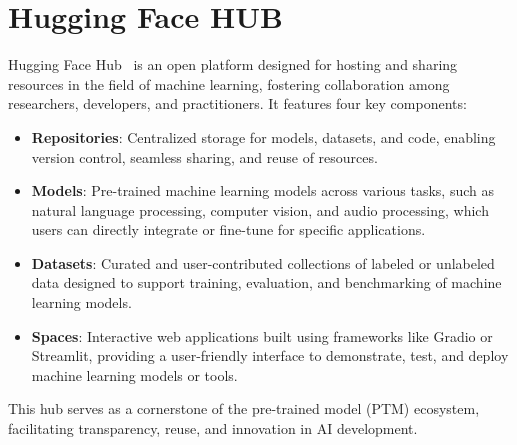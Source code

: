 \documentclass[12pt,a4paper, oneside, openright]{book}
\begin{document}
\section{Hugging Face HUB}
Hugging Face Hub~\cite{huggingface2025} is an open platform designed for hosting and sharing resources in the field of machine learning, fostering collaboration among researchers, developers, and practitioners. It features four key components:  
\begin{itemize}
    \item \textbf{Repositories}: Centralized storage for models, datasets, and code, enabling version control, seamless sharing, and reuse of resources. 
    \item \textbf{Models}: Pre-trained machine learning models across various tasks, such as natural language processing, computer vision, and audio processing, which users can directly integrate or fine-tune for specific applications. 
    \item \textbf{Datasets}: Curated and user-contributed collections of labeled or unlabeled data designed to support training, evaluation, and benchmarking of machine learning models.
    \item \textbf{Spaces}: Interactive web applications built using frameworks like Gradio or Streamlit, providing a user-friendly interface to demonstrate, test, and deploy machine learning models or tools.
\end{itemize}
This hub serves as a cornerstone of the pre-trained model (PTM) ecosystem, facilitating transparency, reuse, and innovation in AI development.
\end{document}
